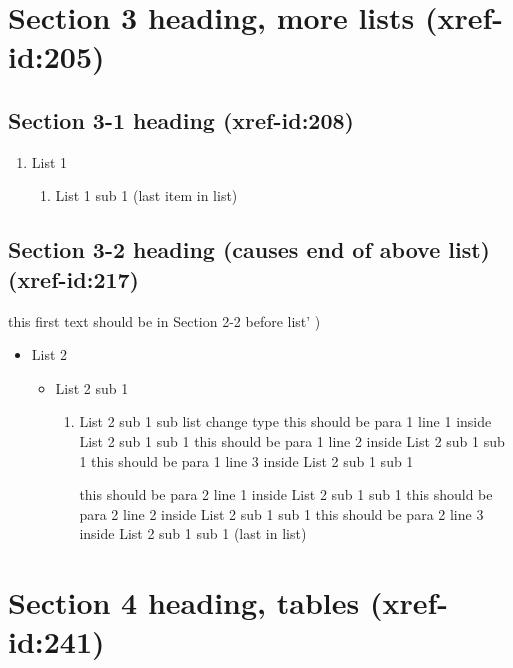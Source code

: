 \documentclass[11pt]{article}
\begin{document}
\section{Section 3 heading, more lists   (xref-id:205)  }
 \label{obj-205}
 \label{obj-204}
\subsection{Section 3-1 heading   (xref-id:208)  }
 \label{obj-208}
 \label{obj-207}
\begin{enumerate}
\item
List 1
\begin{enumerate}
\item
List 1 sub 1 (last item in list)
\end{enumerate}
\end{enumerate}
\subsection{Section 3-2 heading (causes end of above list)   (xref-id:217)  }
 \label{obj-217}
 \label{obj-216}
this first text should be in Section 2-2 before list' )

\begin{itemize}
\item
List 2
\begin{itemize}
\item
List 2 sub 1
\begin{enumerate}
\item
List 2 sub 1 sub list change type
      this should be para 1 line 1 inside List 2 sub 1 sub 1
      this should be para 1 line 2 inside List 2 sub 1 sub 1
      this should be para 1 line 3 inside List 2 sub 1 sub 1

\vspace{\baselineskip}
      this should be para 2 line 1 inside List 2 sub 1 sub 1
      this should be para 2 line 2 inside List 2 sub 1 sub 1
      this should be para 2 line 3 inside List 2 sub 1 sub 1 (last in list)
\vspace{\baselineskip}

\end{enumerate}
\end{itemize}
\end{itemize}
\section{Section 4 heading, tables   (xref-id:241)  }
 \label{obj-241}
 \label{obj-240}
\end{document}
